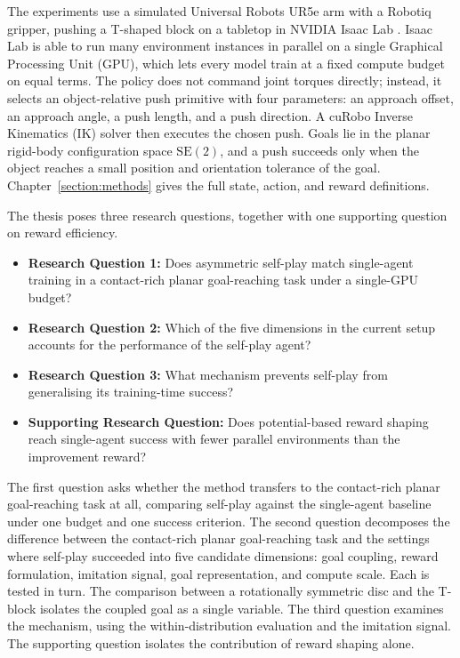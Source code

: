 The experiments use a simulated Universal Robots UR5e arm with a Robotiq gripper,
pushing a T-shaped block on a tabletop in NVIDIA Isaac Lab
\cite{Mittal2023IsaacLab}. Isaac Lab is able to run many environment instances in parallel
on a single Graphical Processing Unit (GPU), which lets every model train at a
fixed compute budget on equal terms. The policy does not command joint torques
directly; instead, it selects an object-relative push primitive with four
parameters: an approach offset, an approach angle, a push length, and a push
direction. A cuRobo Inverse Kinematics (IK) solver then executes the chosen push.
Goals lie in the planar rigid-body configuration space $\mathrm{SE}(2)$, and a
push succeeds only when the object reaches a small position and orientation
tolerance of the goal. Chapter~\ref{section:methods} gives the full state, action,
and reward definitions.

The thesis poses three research questions, together with
one supporting question on reward efficiency.
\begin{itemize}
  \item \textbf{Research Question 1:} Does asymmetric self-play match single-agent training in a
        contact-rich planar goal-reaching task under a single-GPU budget?
  \item \textbf{Research Question 2:} Which of the five dimensions in the current setup accounts
        for the performance of the self-play agent?
  \item \textbf{Research Question 3:} What mechanism prevents self-play from generalising its
        training-time success?
  \item \textbf{Supporting Research Question:} Does potential-based reward shaping reach
        single-agent success with fewer parallel environments than the
        improvement reward?
\end{itemize}

The first question asks whether the method transfers to the contact-rich planar
goal-reaching task at all,
comparing self-play against the single-agent baseline under one budget and one
success criterion. The second question decomposes the difference between the
contact-rich planar goal-reaching task
and the settings where self-play succeeded into five candidate dimensions: goal
coupling, reward
formulation, imitation signal, goal representation, and compute scale. Each is
tested in turn. The
comparison between a rotationally symmetric disc and the T-block isolates the
coupled goal as a single variable. The third question examines the mechanism,
using the within-distribution evaluation and the imitation signal. The
supporting question isolates the contribution of reward shaping alone.

